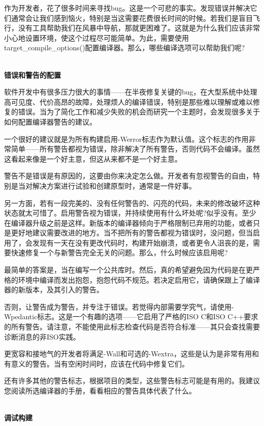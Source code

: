 作为开发者，花了很多时间来寻找bug。这是一个可悲的事实。发现错误并解决它们通常会让我们感到恼火，特别是当这需要花费很长时间的时候。若我们是盲目飞行，没有工具帮助我们在风暴中导航，那就更困难了。这就是为什么我们应该非常小心地设置环境，使这个过程尽可能简单。为此，需要使用target\_compile\_options()配置编译器。那么，哪些编译选项可以帮助我们呢?

\hspace*{\fill} \\ %
\noindent
\textbf{错误和警告的配置}

软件开发中有很多压力很大的事情——在半夜修复关键的bug，在大型系统中处理高可见度、代价高昂的故障，处理烦人的编译错误，特别是那些难以理解或难以修复的错误。当为了简化工作和减少失败的机会而研究一个主题时，会发现很多关于如何配置编译器警告的建议。

一个很好的建议就是为所有构建启用-Werror标志作为默认值。这个标志的作用非常简单——所有警告都视为错误，除非解决了所有警告，否则代码不会编译。虽然这看起来像是一个好主意，但这从来都不是一个好主意。

警告不是错误是有原因的，这要由你来决定怎么做。开发者有忽视警告的自由，特别是当对解决方案进行试验和创建原型时，通常是一件好事。

另一方面，若有一段完美的、没有任何警告的、闪亮的代码，未来的修改破坏这种状态就太可惜了。启用警告视为错误，并持续使用有什么坏处呢?似乎没有。至少在编译器升级之前是这样。新版本的编译器倾向于严格限制已弃用的功能，或者只是更好地建议需要改进的地方。当不把所有的警告都视为错误时，没问题，但当启用了，会发现有一天在没有更改代码时，构建开始崩溃，或者更令人沮丧的是，需要快速修复一个与新警告完全无关的问题。那么，什么时候应该启用呢?

最简单的答案是，当在编写一个公共库时。然后，真的希望避免因为代码是在更严格的环境中编译而发出抱怨，抱怨代码不规范。若决定启用它，请确保跟上了编译器的新版本，及其引入的警告。

否则，让警告成为警告，并专注于错误。若觉得内部需要学究气，请使用-Wpedantic标志。这是一个有趣的选项——它启用了严格的ISO C和ISO C++要求的所有警告。请注意，不能使用此标志检查代码是否符合标准——其只会查找需要诊断消息的非ISO实践。

更宽容和接地气的开发者将满足-Wall和可选的-Wextra，这些是认为是非常有用和有意义的警告。当有空闲时间时，应该在代码中修复它们。

还有许多其他的警告标志，根据项目的类型，这些警告标志可能是有用的。我建议您阅读所选编译器的手册，看看相应的警告具体代表了什么。

\hspace*{\fill} \\ %
\noindent
\textbf{调试构建}

